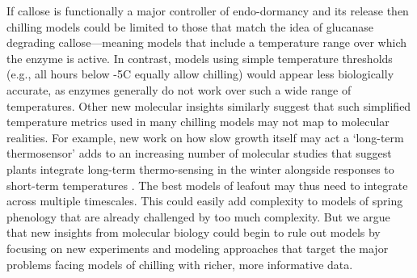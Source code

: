\documentclass[11pt]{article}
\begin{document}


If callose is functionally a major controller of endo-dormancy and its release then chilling models could be limited to those that match the idea of glucanase degrading callose---meaning models that include a temperature range over which the enzyme is active. In contrast, models using simple temperature thresholds (e.g., all hours below -5\degree C equally allow chilling) would appear less biologically accurate, as enzymes generally do not work over such a wide range of temperatures. Other new molecular insights similarly suggest that such simplified temperature metrics used in many chilling models may not map to molecular realities. For example, new work on how slow growth itself may act  a `long-term thermosensor' \citep{zhao2020temperature} 
adds to an increasing number of molecular studies that suggest plants integrate long-term thermo-sensing in the winter alongside responses to short-term temperatures \citep{antoniou2021feeling,Satake2022}. The best models of leafout may thus need to integrate across multiple timescales. This could easily add complexity to models of spring phenology that are already challenged by too much complexity. But we argue that new insights from molecular biology could begin to rule out models by focusing on new experiments and modeling approaches that target the major problems facing models of chilling with richer, more informative data. 
\end{document}
